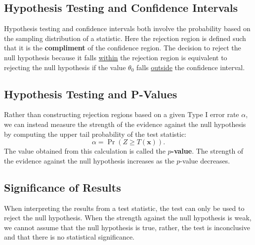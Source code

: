 \documentclass{article}
\begin{document}
\subsection{Hypothesis Testing and Confidence Intervals}
Hypothesis testing and confidence intervals both involve the
probability based on the sampling distribution of a statistic. Here the
rejection region is defined such that it is the \textbf{compliment} of
the confidence region. The decision to reject the null hypothesis
because it falls \underline{within} the rejection region is equivalent
to rejecting the null hypothesis if the value \(\theta_0\) falls
\underline{outside} the confidence interval.
\subsection{Hypothesis Testing and P-Values}
Rather than constructing rejection regions based on a given Type I
error rate \(\alpha\), we can instead measure the strength of the
evidence against the null hypothesis by computing the upper tail
probability of the test statistic:
\begin{equation*}
    \alpha = \Pr{\left( Z \geq T\left( \symbf{x} \right) \right)}.
\end{equation*}
The value obtained from this calculation is called the
\textbf{\(p\)-value}. The strength of the evidence against the null
hypothesis increases as the \(p\)-value decreases.
\subsection{Significance of Results}
When interpreting the results from a test statistic, the test can only
be used to reject the null hypothesis. When the strength against the
null hypothesis is weak, we cannot assume that the null hypothesis is
true, rather, the test is inconclusive and that there is no statistical
significance.
\end{document}
